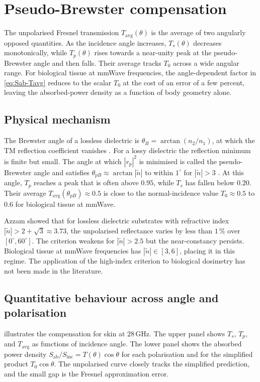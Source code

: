 \documentclass[journal,twocolumn,10pt]{IEEEtran}
\theoremstyle{plain}
\theoremstyle{remark}
\newcommand{\Sinc}{S_{\mathrm{inc}}}
\newcommand{\Sab}{S_{\mathrm{ab}}}
\newcommand{\Tavg}{T_{\mathrm{avg}}}
\newcommand{\ntilde}{\tilde{n}}
\begin{document}
\section{Pseudo-Brewster compensation}\label{sec:pB}

The unpolarised Fresnel transmission $\Tavg(\theta)$ is the average
of two angularly opposed quantities. As the incidence angle
increases, $T_s(\theta)$ decreases monotonically, while $T_p(\theta)$
rises towards a near-unity peak at the pseudo-Brewster angle and
then falls. Their average tracks $T_0$ across a wide angular range.
For biological tissue at mmWave frequencies, the angle-dependent
factor in \eqref{eq:Sab-Tavg} reduces to the scalar $T_0$ at the
cost of an error of a few percent, leaving the absorbed-power
density as a function of body geometry alone.

\subsection{Physical mechanism}\label{subsec:pB-mech}
The Brewster angle of a lossless dielectric is $\theta_B =
\arctan(n_2/n_1)$, at which the TM reflection coefficient vanishes
\cite{BornWolf1999}. For a lossy dielectric the reflection minimum
is finite but small. The angle at which $|r_p|^2$ is minimised is
called the pseudo-Brewster angle and satisfies $\theta_{pB} \approx
\arctan|\ntilde|$ to within $1^\circ$ for $|\ntilde| > 3$
\cite{Potter1970,Ohman1977}. At this angle, $T_p$ reaches a peak
that is often above $0.95$, while $T_s$ has fallen below $0.20$.
Their average $\Tavg(\theta_{pB}) \approx 0.5$ is close to the
normal-incidence value $T_0 \approx 0.5$ to $0.6$ for biological
tissue at mmWave.

Azzam \cite{Azzam2015} showed that for lossless dielectric
substrates with refractive index $|\ntilde| > 2 + \sqrt{3} \approx
3.73$, the unpolarised reflectance varies by less than $1\,\%$ over
$[0^\circ, 60^\circ]$. The criterion weakens for $|\ntilde| > 2.5$
but the near-constancy persists. Biological tissue at mmWave
frequencies has $|\ntilde| \in [3, 6]$, placing it in this regime.
The application of the high-index criterion to biological dosimetry
has not been made in the literature.

\subsection{Quantitative behaviour across angle and polarisation}
\label{subsec:pB-quant}
 illustrates the compensation for skin at
$28\,$GHz. The upper panel shows $T_s$, $T_p$, and $\Tavg$ as
functions of incidence angle. The lower panel shows the absorbed
power density $\Sab/\Sinc = T(\theta)\cos\theta$ for each
polarisation and for the simplified product $T_0 \cos\theta$. The
unpolarised curve closely tracks the simplified prediction, and the
small gap is the Fresnel approximation error.
\end{document}
